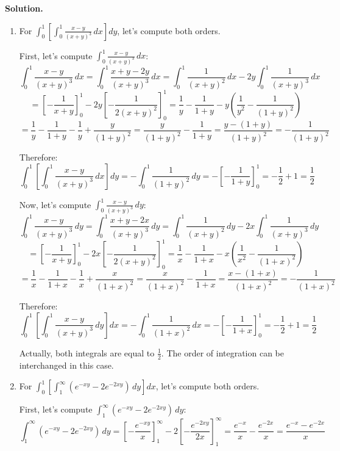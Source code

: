 \noindent\textbf{Solution.}
\begin{enumerate}[label=(\alph*)]
    \item For $\int_{0}^{1} \left[ \int_{0}^{1} \frac{x - y}{(x + y)^{3}} \, dx \right] dy$, let's compute both orders.
    
    First, let's compute $\int_{0}^{1} \frac{x - y}{(x + y)^{3}} \, dx$:
    \[\int_{0}^{1} \frac{x - y}{(x + y)^{3}} \, dx = \int_{0}^{1} \frac{x + y - 2y}{(x + y)^{3}} \, dx = \int_{0}^{1} \frac{1}{(x + y)^{2}} \, dx - 2y \int_{0}^{1} \frac{1}{(x + y)^{3}} \, dx\]
    \[= \left[-\frac{1}{x + y}\right]_{0}^{1} - 2y \left[-\frac{1}{2(x + y)^{2}}\right]_{0}^{1} = \frac{1}{y} - \frac{1}{1 + y} - y\left(\frac{1}{y^{2}} - \frac{1}{(1 + y)^{2}}\right)\]
    \[= \frac{1}{y} - \frac{1}{1 + y} - \frac{1}{y} + \frac{y}{(1 + y)^{2}} = \frac{y}{(1 + y)^{2}} - \frac{1}{1 + y} = \frac{y - (1 + y)}{(1 + y)^{2}} = -\frac{1}{(1 + y)^{2}}\]
    
    Therefore:
    \[\int_{0}^{1} \left[ \int_{0}^{1} \frac{x - y}{(x + y)^{3}} \, dx \right] dy = -\int_{0}^{1} \frac{1}{(1 + y)^{2}} \, dy = -\left[-\frac{1}{1 + y}\right]_{0}^{1} = -\frac{1}{2} + 1 = \frac{1}{2}\]
    
    Now, let's compute $\int_{0}^{1} \frac{x - y}{(x + y)^{3}} \, dy$:
    \[\int_{0}^{1} \frac{x - y}{(x + y)^{3}} \, dy = \int_{0}^{1} \frac{x + y - 2x}{(x + y)^{3}} \, dy = \int_{0}^{1} \frac{1}{(x + y)^{2}} \, dy - 2x \int_{0}^{1} \frac{1}{(x + y)^{3}} \, dy\]
    \[= \left[-\frac{1}{x + y}\right]_{0}^{1} - 2x \left[-\frac{1}{2(x + y)^{2}}\right]_{0}^{1} = \frac{1}{x} - \frac{1}{1 + x} - x\left(\frac{1}{x^{2}} - \frac{1}{(1 + x)^{2}}\right)\]
    \[= \frac{1}{x} - \frac{1}{1 + x} - \frac{1}{x} + \frac{x}{(1 + x)^{2}} = \frac{x}{(1 + x)^{2}} - \frac{1}{1 + x} = \frac{x - (1 + x)}{(1 + x)^{2}} = -\frac{1}{(1 + x)^{2}}\]
    
    Therefore:
    \[\int_{0}^{1} \left[ \int_{0}^{1} \frac{x - y}{(x + y)^{3}} \, dy \right] dx = -\int_{0}^{1} \frac{1}{(1 + x)^{2}} \, dx = -\left[-\frac{1}{1 + x}\right]_{0}^{1} = -\frac{1}{2} + 1 = \frac{1}{2}\]
    
    Actually, both integrals are equal to $\frac{1}{2}$. The order of integration can be interchanged in this case.
    
    \item For $\int_{0}^{1} \left[ \int_{1}^{\infty} (e^{-xy} - 2e^{-2xy}) \, dy \right] dx$, let's compute both orders.
    
    First, let's compute $\int_{1}^{\infty} (e^{-xy} - 2e^{-2xy}) \, dy$:
    \[\int_{1}^{\infty} (e^{-xy} - 2e^{-2xy}) \, dy = \left[-\frac{e^{-xy}}{x}\right]_{1}^{\infty} - 2\left[-\frac{e^{-2xy}}{2x}\right]_{1}^{\infty} = \frac{e^{-x}}{x} - \frac{e^{-2x}}{x} = \frac{e^{-x} - e^{-2x}}{x}\]
    

\end{enumerate}
